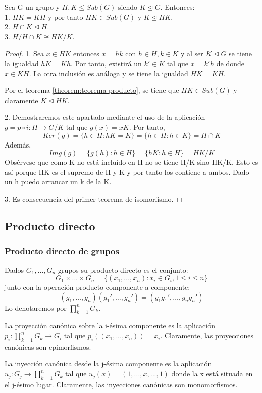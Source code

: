 \begin{theorem}
Sea G un grupo y $H,K \le Sub(G)$ siendo $K \trianglelefteq G$. Entonces:\\
1. $HK = KH$ y por tanto $HK \in Sub(G)$ y $K \trianglelefteq HK$.\\
2. $H \cap K \trianglelefteq H$.\\
3. $H/H \cap K \cong HK/K$.
\end{theorem}
\begin{proof}
1. Sea $x \in HK$ entonces $x = hk$ con $h \in H, k \in K$ y al ser $K \trianglelefteq G$ se tiene la igualdad $hK = Kh$. Por tanto, existirá un $k' \in K$ tal que $x = k'h$ de donde $x \in KH$. La otra inclusión es análoga y se tiene la igualdad $HK = KH$.

Por el teorema \ref{theorem:teorema-producto}, se tiene que $HK \in Sub(G)$ y claramente $K \trianglelefteq HK$. 

2. Demostraremos este apartado mediante el uso de la aplicación $g=p \circ i: H \rightarrow G/K$ tal que $g(x) = xK$. Por tanto, $$Ker(g) = \{h \in H:hK = K\} = \{h \in H: h \in K\} = H \cap K$$ Además, $$Img(g) = \{g(h):h \in H\} = \{hK: h \in H\} = HK/K$$ Obsérvese que como K no está incluído en H no se tiene H/K sino HK/K. Esto es así porque HK es el supremo de H y K y por tanto los contiene a ambos. Dado un h puedo arrancar un k de la K.
 
3. Es consecuencia del primer teorema de isomorfismo.
\end{proof}

\subsection{Producto directo}

\subsubsection{Producto directo de grupos}

\begin{definition}
Dados $G_1,...,G_n$ grupos su producto directo es el conjunto: $$G_1 \times ... \times G_n = \{(x_1,...,x_n):x_i \in G_i,1 \le i \le n\}$$ junto con la operación producto componente a componente: $$(g_1,\ldots,g_n)(g_1',\ldots,g_n') = (g_1g_1',\ldots,g_ng_n')$$ Lo denotaremos por $\prod_{k=1}^{n} G_k$.
\end{definition}

\begin{definition}
La proyección canónica sobre la i-ésima componente es la aplicación $p_i:\prod_{k=1}^{n} G_k \rightarrow G_i$ tal que $p_i((x_1,...,x_n)) = x_i$. Claramente, las proyecciones canónicas son epimorfismos.

La inyección canónica desde la j-ésima componente es la aplicación $u_j:G_j \rightarrow \prod_{k=1}^{n} G_k$ tal que $u_j(x) = (1,...,x,...,1)$ donde la x está situada en el j-ésimo lugar. Claramente, las inyecciones canónicas son monomorfismos.
\end{definition}

